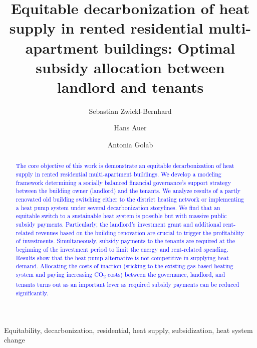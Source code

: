 \documentclass[review]{elsarticle}
\begin{document}
\begin{frontmatter}

\title{Equitable decarbonization of heat supply in rented residential multi-apartment buildings: Optimal subsidy allocation between landlord and tenants}
\author[1]{Sebastian Zwickl-Bernhard}
\author[1]{Hans Auer}
\author[1]{Antonia Golab}
\address[1]{Energy Economics Group (EEG), Technische Universität Wien, Gusshausstrasse 25-29/E370-3, 1040 Wien, Austria}

\begin{abstract}
	\textcolor{blue}{The core objective of this work is demonstrate an equitable decarbonization of heat supply in rented residential multi-apartment buildings. We develop a modeling framework determining a socially balanced financial governance's support strategy between the building owner (landlord) and the tenants. We analyze results of a partly renovated old building switching either to the district heating network or implementing a heat pump system under several decarbonization storylines. We find that an equitable switch to a sustainable heat system is possible but with massive public subsidy payments. Particularly, the landlord’s investment grant and additional rent-related revenues based on the building renovation are crucial to trigger the profitability of investments. Simultaneously, subsidy payments to the tenants are required at the beginning of the investment period to limit the energy and rent-related spending. Results show that the heat pump alternative is not competitive in supplying heat demand. Allocating the costs of inaction (sticking to the existing gas-based heating system and paying increasing CO\textsubscript{2} costs) between the governance, landlord, and tenants turns out as an important lever as required subsidy payments can be reduced significantly.}
\end{abstract}

\begin{keyword}
	Equitability, decarbonization, residential, heat supply, subsidization, heat system change
	
\end{keyword}
\end{frontmatter}

\newpage
\end{document}
